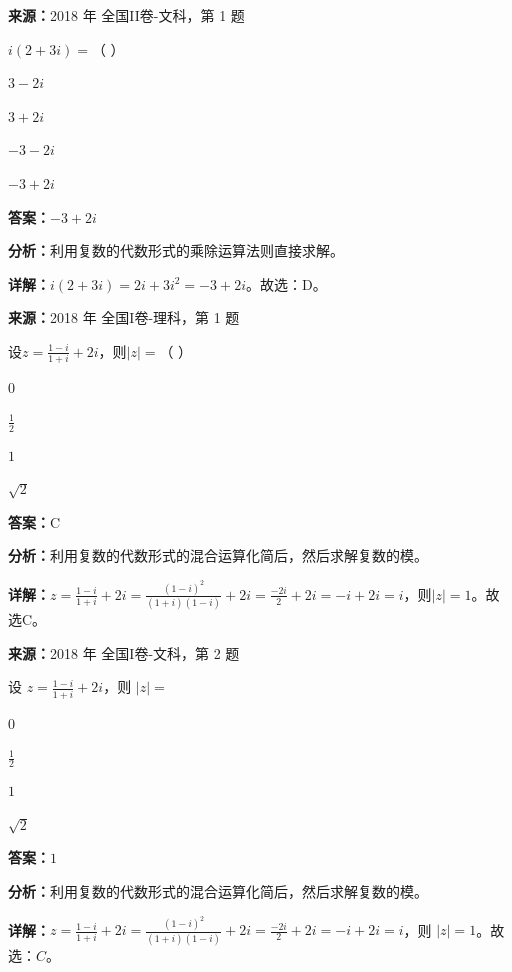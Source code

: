 \begin{question}[points=5]
\textbf{来源：}2018 年 全国II卷-文科，第 1 题\par
$i(2+3i)=$（ ）
\begin{choices}
  \item $3-2i$
  \item $3+2i$
  \item $-3-2i$
  \item $-3+2i$
\end{choices}
\begin{solution}
\textbf{答案：}$-3+2i$

\textbf{分析：}利用复数的代数形式的乘除运算法则直接求解。

\textbf{详解：}$i(2+3i)=2i+3i^2=-3+2i$。故选：D。
\end{solution}
\end{question}

\begin{question}[points=5]
\textbf{来源：}2018 年 全国I卷-理科，第 1 题\par
设$z=\frac{1-i}{1+i}+2i$，则$|z|=$（    ）
\begin{choices}
  \item $0$
  \item $\frac{1}{2}$
  \item $1$
  \item $\sqrt{2}$
\end{choices}
\begin{solution}
\textbf{答案：}C

\textbf{分析：}利用复数的代数形式的混合运算化简后，然后求解复数的模。

\textbf{详解：}$z=\frac{1-i}{1+i}+2i=\frac{(1-i)^2}{(1+i)(1-i)}+2i=\frac{-2i}{2}+2i=-i+2i=i$，则$|z|=1$。故选C。
\end{solution}
\end{question}

\begin{question}[points=5]
\textbf{来源：}2018 年 全国I卷-文科，第 2 题\par
设 $z=\frac{1-i}{1+i}+2i$，则 $|z|=$
\begin{choices}
  \item $0$
  \item $\frac{1}{2}$
  \item $1$
  \item $\sqrt{2}$
\end{choices}
\begin{solution}
\textbf{答案：}$1$

\textbf{分析：}利用复数的代数形式的混合运算化简后，然后求解复数的模。

\textbf{详解：}$z=\frac{1-i}{1+i}+2i=\frac{(1-i)^2}{(1+i)(1-i)}+2i=\frac{-2i}{2}+2i=-i+2i=i$，则 $|z|=1$。故选：$C$。
\end{solution}
\end{question}

